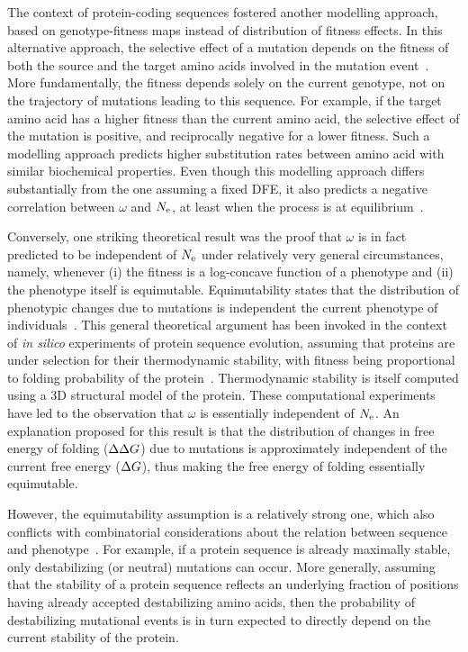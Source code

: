 The context of protein-coding sequences fostered another modelling approach, based on genotype-fitness maps instead of distribution of fitness effects.
In this alternative approach, the selective effect of a mutation depends on the fitness of both the source and the target amino acids involved in the mutation event~\citep{Halpern1998, Rodrigue2010, Tamuri2012}.
More fundamentally, the fitness depends solely on the current genotype, not on the trajectory of mutations leading to this sequence.
For example, if the target amino acid has a higher fitness than the current amino acid, the selective effect of the mutation is positive, and reciprocally negative for a lower fitness.
Such a modelling approach predicts higher \gls{substitution} rates between amino acid with similar biochemical properties.
Even though this modelling approach differs substantially from the one assuming a fixed \acrshort{DFE}, it also predicts a negative correlation between $\omega$ and $N_{\text{e}}$, at least when the process is at equilibrium~\citep{Spielman2015, DosReis2015}.

Conversely, one striking theoretical result was the proof that $\omega$ is in fact predicted to be independent of $N_{\text{e}}$ under relatively very general circumstances, namely, whenever (i) the fitness is a log-concave function of a \gls{phenotype} and (ii) the \gls{phenotype} itself is equimutable.
Equimutability states that the distribution of phenotypic changes due to mutations is independent the current \gls{phenotype} of individuals~\citep{Cherry1998}.
This general theoretical argument has been invoked in the context of \textit{in silico} experiments of protein sequence evolution, assuming that proteins are under selection for their thermodynamic stability, with fitness being proportional to folding probability of the protein~\citep{Goldstein2013}.
Thermodynamic stability is itself computed using a 3D structural model of the protein.
These computational experiments have led to the observation that $\omega$ is essentially independent of $N_{\text{e}}$.
An explanation proposed for this result is that the distribution of changes in free energy of folding ($\Delta \Delta G$) due to mutations is approximately independent of the current free energy ($\Delta G$), thus making the free energy of folding essentially equimutable.

However, the equimutability assumption is a relatively strong one, which also conflicts with combinatorial considerations about the relation between sequence and phenotype~\citep{Serohijos2012}.
For example, if a protein sequence is already maximally stable, only destabilizing (or neutral) mutations can occur.
More generally, assuming that the stability of a protein sequence reflects an underlying fraction of positions having already accepted destabilizing amino acids, then the probability of destabilizing mutational events is in turn expected to directly depend on the current stability of the protein.

